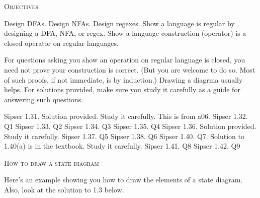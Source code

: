 

\renewcommand\AUTHOR{John Doe}


\topmatter

\textsc{Objectives}
\begin{itemize}
\li Design DFAs.
\li Design NFAs.
\li Design regexes.
\li Show a language is regular by designing a DFA, NFA, or regex.
\li Show a language construction (operator) is a closed operator on
regular languages.
\end{itemize}

For questions asking you show an operation on regular
language is closed, you need not prove your construction is correct.
(But you are welcome to do so. Most of such proofs, if not immediate,
is by induction.)
Drawing a diagrma usually helps.
For solutions provided, make sure you study it carefully
as a guide for answering such questions.


\begin{myenum}
\li Sipser 1.31. Solution provided. Study it carefully. This is from a06. 
\li Sipser 1.32. Q1
\li Sipser 1.33. Q2
\li Sipser 1.34. Q3
\li Sipser 1.35. Q4
\li Sipser 1.36. Solution provided. Study it carefully.
\li Sipser 1.37. Q5
\li Sipser 1.38. Q6
\li Sipser 1.40. Q7. Solution to 1.40(a) is in the textbook. Study it carefully.
\li Sipser 1.41. Q8
\li Sipser 1.42. Q9
\end{myenum}

\newpage
\textsc{How to draw a state diagram}

Here's an example showing you how to draw the elements of a state diagram.
Also, look at the solution to 1.3 below.

\begin{center}
\end{center}

